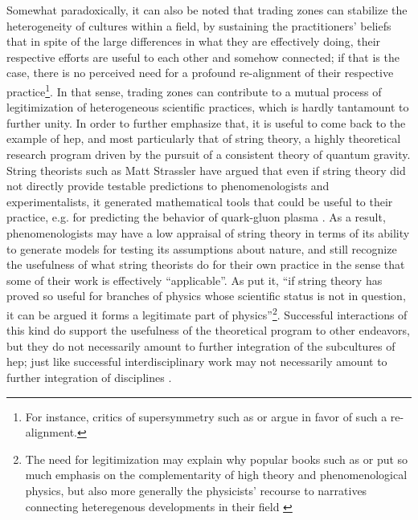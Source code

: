 \documentclass[smallextended]{svjour3}
\begin{document}
Somewhat paradoxically, it can also be noted that trading zones can stabilize the heterogeneity of cultures within a field, by sustaining the practitioners' beliefs that in spite of the large differences in what they are effectively doing, their respective efforts are useful to each other and somehow connected; if that is the case, there is no perceived need for a profound re-alignment of their respective practice\footnote{For instance, critics of supersymmetry such as \citet{woit2006not} or \citet{hossenfelder2018lost} argue in favor of such a re-alignment.}. In that sense, trading zones can contribute to a mutual process of legitimization of heterogeneous scientific practices, which is hardly tantamount to further unity. In order to further emphasize that, it is useful to come back to the example of \gls{hep}, and most particularly that of string theory, a highly theoretical research program driven by the pursuit of a consistent theory of quantum gravity. String theorists such as Matt Strassler have argued that even if string theory did not directly provide testable predictions to phenomenologists and experimentalists, it generated mathematical tools that could be useful to their practice, e.g. for predicting the behavior of quark-gluon plasma \citep{Ritson2021}. As a result, phenomenologists may have a low appraisal of string theory in terms of its ability to generate models for testing its assumptions about nature, and still recognize the usefulness of what string theorists do for their own practice in the sense that some of their work is effectively ``applicable''. As \citet{Ritson2015} put it, ``if string theory has proved so useful for branches of physics whose scientific status is not in question, it can be argued it forms a legitimate part of physics''\footnote{The need for legitimization may explain why popular books such as \citet{kane2000supersymmetry} or \citealt{randall_warped_2006} put so much emphasis on the complementarity of high theory and phenomenological physics, but also more generally the physicists' recourse to narratives connecting heteregenous developments in their field \citep{Borrelli2015,Borrelli2019}}. Successful interactions of this kind do support the usefulness of the theoretical program to other endeavors, but they do not necessarily amount to further integration of the subcultures of \gls{hep}; just like successful interdisciplinary work may not necessarily amount to further integration of disciplines \citep{GrneYanoff2016}. 
\end{document}
